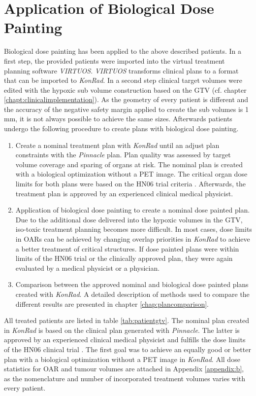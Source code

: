 \section{Application of Biological Dose Painting}
Biological dose painting has been applied to the above described patients. In a first step, the provided patients were imported into the virtual treatment planning software \textit{VIRTUOS}. \textit{VIRTUOS} transforms clinical plans to a format that can be imported to \textit{KonRad}. In a second step clinical target volumes were edited with the hypoxic sub volume construction based on the GTV (cf. chapter \ref{chapt:clinicalimplementation}). As the geometry of every patient is different and the accuracy of the negative safety margin applied to create the sub volumes is 1 mm, it is not always possible to achieve the same sizes. Afterwards patients undergo the following procedure to create plans with biological dose painting.
\begin{enumerate}
\item Create a nominal treatment plan with \textit{KonRad} until an adjust plan constraints with the \textit{Pinnacle} plan. Plan quality was assessed by target volume coverage and sparing of organs at risk. The nominal plan is created with a biological optimization without a PET image. The critical organ dose limits for both plans were based on the HN06 trial criteria \cite{HN06}. Afterwards, the treatment plan is approved by an experienced clinical medical physicist.
\item Application of biological dose painting to create a nominal dose painted plan. Due to the additional dose delivered into the hypoxic volumes in the GTV, iso-toxic treatment planning becomes more difficult. In most cases, dose limits in OARs can be achieved by changing overlap priorities in \textit{KonRad} to achieve a better treatment of critical structures. If dose painted plans were within limits of the HN06 trial or the clinically approved plan, they were again evaluated by a medical physicist or a physician.
\item Comparison between the approved nominal and biological dose painted plans created with \textit{KonRad}. A detailed description of methods used to compare the different results are presented in chapter \ref{chap:plancomparison}.
\end{enumerate}
All treated patients are listed in table \ref{tab:patientgtv}. The nominal plan created in \textit{KonRad} is based on the clinical plan generated with \textit{Pinnacle}. The latter is approved by an experienced clinical medical physicist and fulfills the dose limits of the HN06 clinical trial \cite{HN06}. The first goal was to achieve an equally good or better plan with a biological optimization without a PET image in \textit{KonRad}. All dose statistics for OAR and tumour volumes are attached in Appendix \ref{appendix:b}, as the nomenclature and number of incorporated treatment  volumes varies with every patient.
